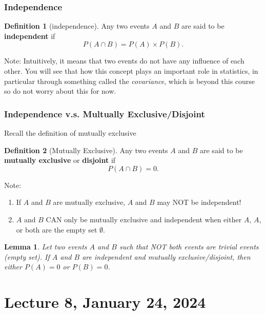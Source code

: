 \documentclass[
]{book}
\newtheorem{lemma}{Lemma}[chapter]
\theoremstyle{definition}
\newtheorem{definition}{Definition}[chapter]
\theoremstyle{definition}
\theoremstyle{definition}
\theoremstyle{definition}
\theoremstyle{remark}
\begin{document}
\subsection{Independence}\label{independence}

\begin{definition}[independence]
Any two events \(A\) and \(B\) are said to be \textbf{independent} if
\[
  P(A \cap B) = P(A)\times P(B).
\]
\end{definition}

Note: Intuitively, it means that two events do not have any influence of each other. You will see that how this concept plays an important role in statistics, in particular through something called the \emph{covariance}, which is beyond this course so do not worry about this for now.

\subsection{Independence v.s. Multually Exclusive/Disjoint}\label{independence-v.s.-multually-exclusivedisjoint}

Recall the definition of mutually exclusive

\begin{definition}[Mutually Exclusive]
Any two events \(A\) and \(B\) are said to be \textbf{mutually exclusive} or \textbf{disjoint} if
\[
  P(A \cap B) = 0.
\]
\end{definition}

Note:

\begin{enumerate}
\def\labelenumi{\arabic{enumi}.}
\item
  If \(A\) and \(B\) are mutually exclusive, \(A\) and \(B\) may NOT be independent!
\item
  \(A\) and \(B\) CAN only be mutually exclusive and independent when either \(A\), \(A\), or both are the empty set \(\emptyset\).
\end{enumerate}

\begin{lemma}
Let two events \(A\) and \(B\) such that NOT both events are trivial events (empty set). If \(A\) and \(B\) are independent and mutually exclusive/disjoint, then either \(P(A) = 0\) or \(P(B) = 0\).
\end{lemma}

\chapter{Lecture 8, January 24, 2024}\label{lecture-8-january-24-2024}
\end{document}
